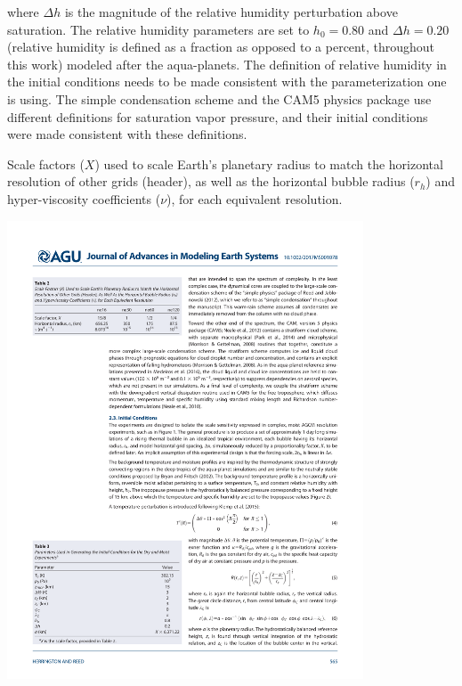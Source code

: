 where $\Delta h$ is the magnitude of the relative humidity perturbation above saturation. The relative humidity parameters are set to $h_0 = 0.80$ and $\Delta h  = 0.20$ (relative humidity is defined as a fraction as opposed to a percent, throughout this work) modeled after the aqua-planets. The definition of relative humidity in the initial conditions needs to be made consistent with the parameterization one is using. The simple condensation scheme and the CAM5 physics package use different definitions for saturation vapor pressure, and their initial conditions were made consistent with these definitions.

\begin{table}
\caption{Scale factors ($X$) used to scale Earth’s planetary radius to match the horizontal resolution of other grids (header), as well as the horizontal bubble radius ($r_h$) and hyper-viscosity coefficients ($\nu$), for each equivalent resolution.}
\begin{center}
\noindent\includegraphics[width=25pc,angle=0]{chapter3/table2.pdf}\\
\end{center}
\label{tbl:table3-2}
\end{table}

